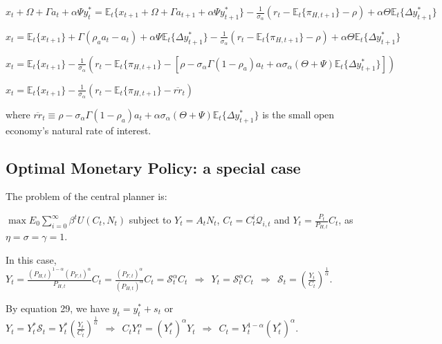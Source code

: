 \documentclass[
]{article}
\begin{document}
\(x_t + \Omega+\Gamma a_t+ \alpha \Psi y_t^* = \mathbb{E}_t\{x_{t+1} + \Omega+\Gamma a_{t+1}+ \alpha \Psi y_{t+1}^*\} -\frac{1}{\sigma_\alpha}(r_t-\mathbb{E}_t\{\pi_{H,t+1}\} -\rho)+ \alpha \Theta \mathbb{E}_t\{\Delta y_{t+1}^*\}\)

\(\displaystyle x_t = \mathbb{E}_t\{x_{t+1}\} +\Gamma (\rho_a a_{t}-a_t)+ \alpha \Psi \mathbb{E}_t\{\Delta y_{t+1}^*\} -\frac{1}{\sigma_\alpha}(r_t-\mathbb{E}_t\{\pi_{H,t+1}\} -\rho)+ \alpha \Theta \mathbb{E}_t\{\Delta y_{t+1}^*\}\)

\(\displaystyle x_t = \mathbb{E}_t\{x_{t+1}\} -\frac{1}{\sigma_\alpha}(r_t-\mathbb{E}_t\{\pi_{H,t+1}\} -[\rho-\sigma_\alpha \Gamma (1-\rho_a)a_t +\alpha \sigma_\alpha(\Theta+\Psi) \mathbb{E}_t\{\Delta y_{t+1}^*\}])\)

\(\displaystyle x_t = \mathbb{E}_t\{x_{t+1}\} -\frac{1}{\sigma_\alpha}(r_t-\mathbb{E}_t\{\pi_{H,t+1}\} -\overline{rr}_t)\)

where
\(\overline{rr}_t \equiv \rho-\sigma_\alpha \Gamma (1-\rho_a)a_t +\alpha \sigma_\alpha(\Theta+\Psi) \mathbb{E}_t\{\Delta y_{t+1}^*\}\)
is the small open economy's natural rate of interest.

\vspace{12pt}

\hypertarget{optimal-monetary-policy-a-special-case}{%
\subsection{Optimal Monetary Policy: a special
case}\label{optimal-monetary-policy-a-special-case}}

\vspace{8pt}

The problem of the central planner is:

\(\displaystyle \max E_0\sum_{i=0}^\infty \beta^t U(C_t,N_t)\) subject
to \(Y_t=A_tN_t\), \(\displaystyle C_t=C_t^i\mathcal{Q}_{i,t}\) and
\(\displaystyle Y_t=\frac{P_t}{P_{H,t}} C_t\), as
\(\eta=\sigma=\gamma=1\).

In this case,
\(\displaystyle Y_t=\frac{(P_{H,t})^{1-\alpha}(P_{F,t})^{\alpha}}{P_{H,t}} C_t = \frac{(P_{F,t})^{\alpha}}{(P_{H,t})^{\alpha}}C_t=\mathcal{S}_t^{\alpha}C_t \ \ \Rightarrow \ \ Y_t=\mathcal{S}_t^{\alpha}C_t \ \ \Rightarrow \ \ \mathcal{S}_t= \left( \frac{Y_t}{C_t} \right)^{\frac{1}{\alpha}}\).

By equation 29, we have \(y_t=y_t^*+s_t\) or
\(\displaystyle Y_t=Y_t^{*} \mathcal{S}_t= Y_t^{*} \left( \frac{Y_t}{C_t} \right)^{\frac{1}{\alpha}} \ \ \Rightarrow \ \ C_t Y_t^\alpha = (Y_t^*)^\alpha Y_t \ \ \Rightarrow \ \ C_t=Y_t^{1-\alpha}(Y_t^*)^\alpha\).
\end{document}
